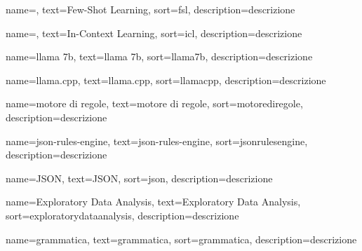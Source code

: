  {
    name=,
    text=Few-Shot Learning,
    sort=fsl,
    description={descrizione}
}

 {
    name=,
    text=In-Context Learning,
    sort=icl,
    description={descrizione}
}

 {
    name=llama 7b,
    text=llama 7b,
    sort=llama7b,
    description={descrizione}
}

 {
    name=llama.cpp,
    text=llama.cpp,
    sort=llamacpp,
    description={descrizione}
}

 {
    name=motore di regole,
    text=motore di regole,
    sort=motorediregole,
    description={descrizione}
}

 {
    name=json-rules-engine,
    text=json-rules-engine,
    sort=jsonrulesengine,
    description={descrizione}
}

 {
    name=JSON,
    text=JSON,
    sort=json,
    description={descrizione}
}

 {
    name=Exploratory Data Analysis,
    text=Exploratory Data Analysis,
    sort=exploratorydataanalysis,
    description={descrizione}
}

 {
    name=grammatica,
    text=grammatica,
    sort=grammatica,
    description={descrizione}
}

